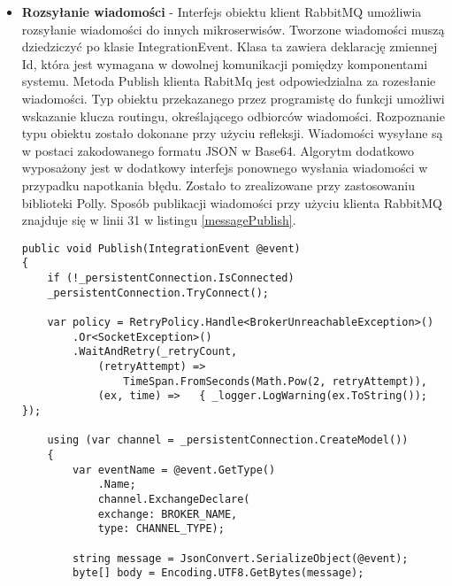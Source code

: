 \begin{itemize}
\begin{lstlisting}[caption=Akcja zapisu zdjęcia.]
[HttpPost("")]
public async Task<IActionResult> Create(IFormFile file)
{
	if (file == null)
	{
		return BadRequest();
	}
	var userId = int.Parse(_userManager.GetUserId(User));
	var result = await _photoService.Create(file, userId);
	await _photoService.SaveChanges();
	
	var integrationEvent = 
		_mapper.Map<ImageClasificationEvent>(result);
	_eventBus.Publish(integrationEvent);
	
	return Ok(new { id = result.Id });
}
\end{lstlisting} 

\item \textbf{Rozsyłanie wiadomości} - Interfejs obiektu klient RabbitMQ umożliwia  rozsyłanie wiadomości do innych mikroserwisów. Tworzone wiadomości muszą dziedziczyć po klasie IntegrationEvent. Klasa ta zawiera deklarację zmiennej Id, która jest wymagana w dowolnej komunikacji pomiędzy komponentami systemu. Metoda Publish klienta RabitMq jest odpowiedzialna za rozesłanie wiadomości. Typ obiektu przekazanego przez programistę do funkcji umożliwi wskazanie klucza routingu, określającego odbiorców wiadomości. Rozpoznanie typu obiektu zostało dokonane przy użyciu refleksji. Wiadomości wysyłane są w postaci zakodowanego formatu JSON w Base64. Algorytm dodatkowo wyposażony jest w dodatkowy interfejs ponownego wysłania wiadomości w przypadku napotkania błędu. Zostało to zrealizowane przy zastosowaniu biblioteki Polly. Sposób publikacji wiadomości przy użyciu klienta RabbitMQ znajduje się w linii 31 w listingu \ref{messagePublish}. 

\begin{lstlisting}[caption={Metoda publikacji wiadomości.}, label={messagePublish}]
public void Publish(IntegrationEvent @event)
{
	if (!_persistentConnection.IsConnected)
	_persistentConnection.TryConnect();

	var policy = RetryPolicy.Handle<BrokerUnreachableException>()
		.Or<SocketException>()
		.WaitAndRetry(_retryCount, 
			(retryAttempt) => 
				TimeSpan.FromSeconds(Math.Pow(2, retryAttempt)), 
			(ex, time) =>	{ _logger.LogWarning(ex.ToString()); });

	using (var channel = _persistentConnection.CreateModel())
	{
		var eventName = @event.GetType()
			.Name;
			channel.ExchangeDeclare(
			exchange: BROKER_NAME,
			type: CHANNEL_TYPE);                
	
		string message = JsonConvert.SerializeObject(@event);
		byte[] body = Encoding.UTF8.GetBytes(message);
	

\end{lstlisting}
\end{itemize}
